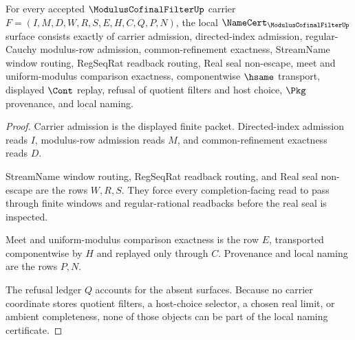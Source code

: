 \begin{theorem}
\label{thm:modulus-cofinal-filter-namecert-obligations}
For every accepted $\ModulusCofinalFilterUp$ carrier $F=(I,M,D,W,R,S,E,H,C,Q,P,N)$, the local $\NameCert_{\ModulusCofinalFilterUp}$ surface consists exactly of carrier admission, directed-index admission, regular-Cauchy modulus-row admission, common-refinement exactness, StreamName window routing, RegSeqRat readback routing, Real seal non-escape, meet and uniform-modulus comparison exactness, componentwise $\hsame$ transport, displayed $\Cont$ replay, refusal of quotient filters and host choice, $\Pkg$ provenance, and local naming.
\end{theorem}
\begin{proof}
Carrier admission is the displayed finite packet. Directed-index admission reads $I$, modulus-row admission reads $M$, and common-refinement exactness reads $D$.

StreamName window routing, RegSeqRat readback routing, and Real seal non-escape are the rows $W,R,S$. They force every completion-facing read to pass through finite windows and regular-rational readbacks before the real seal is inspected.

Meet and uniform-modulus comparison exactness is the row $E$, transported componentwise by $H$ and replayed only through $C$. Provenance and local naming are the rows $P,N$.

The refusal ledger $Q$ accounts for the absent surfaces. Because no carrier coordinate stores quotient filters, a host-choice selector, a chosen real limit, or ambient completeness, none of those objects can be part of the local naming certificate.
\end{proof}



